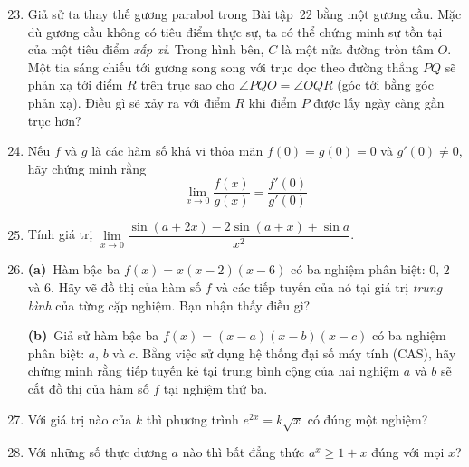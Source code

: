 \begin{minipage}[t][0.91\textheight]{0.73\textwidth}
    \vspace*{0pt}
    \begin{enumerate}[label=\bfseries\arabic*., leftmargin=*, itemsep=0.82em, topsep=0pt, parsep=0pt]
        \setcounter{enumi}{22}

        \item Giả sử ta thay thế gương parabol trong Bài tập~22 bằng một gương cầu. Mặc dù gương cầu không có tiêu điểm thực sự, ta có thể chứng minh sự tồn tại của một tiêu điểm \textit{xấp xỉ}. Trong hình bên, $C$ là một nửa đường tròn tâm $O$. Một tia sáng chiếu tới gương song song với trục dọc theo đường thẳng $PQ$ sẽ phản xạ tới điểm $R$ trên trục sao cho $\angle PQO = \angle OQR$ (góc tới bằng góc phản xạ). Điều gì sẽ xảy ra với điểm $R$ khi điểm $P$ được lấy ngày càng gần trục hơn?

        \item Nếu $f$ và $g$ là các hàm số khả vi thỏa mãn $f(0) = g(0) = 0$ và $g'(0) \neq 0$, hãy chứng minh rằng
        \[
        \lim_{x \to 0} \frac{f(x)}{g(x)} = \frac{f'(0)}{g'(0)}
        \]

        \item Tính giá trị $\lim\limits_{x \to 0} \dfrac{\sin(a + 2x) - 2 \sin(a + x) + \sin a}{x^2}$.

        \item[{\llap{\casicon\hspace{4pt}}\textbf{\theenumi.}}]%
        \textbf{(a)}~Hàm bậc ba $f(x) = x(x - 2)(x - 6)$ có ba nghiệm phân biệt: $0$, $2$ và $6$. Hãy vẽ đồ thị của hàm số $f$ và các tiếp tuyến của nó tại giá trị \textit{trung bình} của từng cặp nghiệm. Bạn nhận thấy điều gì?
        \par\vspace{3pt}
        \textbf{(b)}~Giả sử hàm bậc ba $f(x) = (x - a)(x - b)(x - c)$ có ba nghiệm phân biệt: $a$, $b$ và $c$. Bằng việc sử dụng hệ thống đại số máy tính (CAS), hãy chứng minh rằng tiếp tuyến kẻ tại trung bình cộng của hai nghiệm $a$ và $b$ sẽ cắt đồ thị của hàm số $f$ tại nghiệm thứ ba.

        \item Với giá trị nào của $k$ thì phương trình $e^{2x} = k\sqrt{x}$ có đúng một nghiệm?

        \item Với những số thực dương $a$ nào thì bất đẳng thức $a^x \geqslant 1 + x$ đúng với mọi $x$?


\end{enumerate}
\end{minipage}
